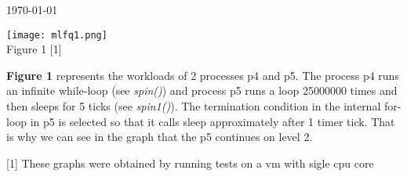 \documentclass[8pt]{article}
\begin{document}
\hfill \small{\today} \\
\begin{center}{\bf
{}
}\end{center}
\begin{center}{\texttt{[image: mlfq1.png]}} \\
{Figure 1 \footnotesize{[1]}} \\
\end{center}

\textbf{Figure 1} represents the workloads of 2 processes p4 and p5.
The process p4 runs an infinite while-loop (see \textit{spin()}) and process p5 runs a loop 25000000 times and then sleeps for 5 ticks (see \textit{spin1()}).
The termination condition in the internal for-loop in p5 is selected so that it calls sleep approximately after 1 timer tick. That is why we can see
in the graph that the p5 continues on level 2.



\vfill
\footnotesize{[1] These graphs were obtained by running tests on a vm with sigle cpu core} \\
\end{document}
